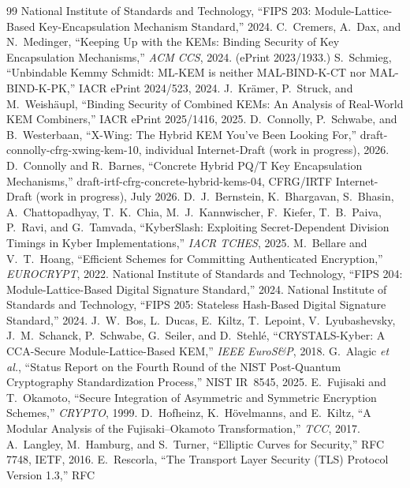 \documentclass[journal]{IEEEtran}
\begin{document}
\begin{thebibliography}{99}
 National Institute of Standards and Technology, ``FIPS 203: Module-Lattice-Based
Key-Encapsulation Mechanism Standard,'' 2024.
 C.~Cremers, A.~Dax, and N.~Medinger, ``Keeping Up with the KEMs: Binding Security of
Key Encapsulation Mechanisms,'' \emph{ACM CCS}, 2024. (ePrint 2023/1933.)
 S.~Schmieg, ``Unbindable Kemmy Schmidt: ML-KEM is neither MAL-BIND-K-CT nor
MAL-BIND-K-PK,'' IACR ePrint 2024/523, 2024.
 J.~Kr\"amer, P.~Struck, and M.~Weish\"aupl, ``Binding Security of Combined KEMs:
An Analysis of Real-World KEM Combiners,'' IACR ePrint 2025/1416, 2025.
 D.~Connolly, P.~Schwabe, and B.~Westerbaan, ``X-Wing: The Hybrid KEM You've Been
Looking For,'' draft-connolly-cfrg-xwing-kem-10, individual Internet-Draft (work in progress), 2026.
 D.~Connolly and R.~Barnes, ``Concrete Hybrid PQ/T Key Encapsulation
Mechanisms,'' draft-irtf-cfrg-concrete-hybrid-kems-04, CFRG/IRTF Internet-Draft (work in
progress), July 2026.
 D.~J.~Bernstein, K.~Bhargavan, S.~Bhasin, A.~Chattopadhyay, T.~K.~Chia,
M.~J.~Kannwischer, F.~Kiefer, T.~B.~Paiva, P.~Ravi, and G.~Tamvada, ``KyberSlash: Exploiting
Secret-Dependent Division Timings in Kyber Implementations,'' \emph{IACR TCHES}, 2025.
 M.~Bellare and V.~T.~Hoang, ``Efficient Schemes for Committing Authenticated
Encryption,'' \emph{EUROCRYPT}, 2022.
 National Institute of Standards and Technology, ``FIPS 204: Module-Lattice-Based
Digital Signature Standard,'' 2024.
 National Institute of Standards and Technology, ``FIPS 205: Stateless Hash-Based
Digital Signature Standard,'' 2024.
 J.~W.~Bos, L.~Ducas, E.~Kiltz, T.~Lepoint, V.~Lyubashevsky, J.~M.~Schanck,
P.~Schwabe, G.~Seiler, and D.~Stehl\'e, ``CRYSTALS-Kyber: A CCA-Secure Module-Lattice-Based KEM,''
\emph{IEEE EuroS\&P}, 2018.
 G.~Alagic \emph{et al.}, ``Status Report on the Fourth Round of the NIST
Post-Quantum Cryptography Standardization Process,'' NIST IR~8545, 2025.
 E.~Fujisaki and T.~Okamoto, ``Secure Integration of Asymmetric and Symmetric
Encryption Schemes,'' \emph{CRYPTO}, 1999.
 D.~Hofheinz, K.~H\"ovelmanns, and E.~Kiltz, ``A Modular Analysis of the
Fujisaki--Okamoto Transformation,'' \emph{TCC}, 2017.
 A.~Langley, M.~Hamburg, and S.~Turner, ``Elliptic Curves for Security,'' RFC
7748, IETF, 2016.
 E.~Rescorla, ``The Transport Layer Security (TLS) Protocol Version 1.3,'' RFC

\end{thebibliography}
\end{document}
